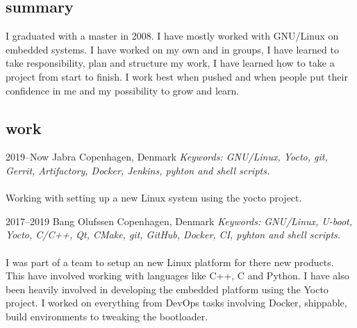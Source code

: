 \documentclass[nocolors]{template/friggeri-cv-a4}
\begin{document}
\subsection{summary}

I graduated with a master in 2008. I have mostly worked with GNU/Linux on embedded systems. I have worked on my own and in groups, I have learned to take responsibility, plan and structure my work, I have learned how to take a project from start to finish. I work best when pushed and when people put their confidence in me and my possibility to grow and learn.

\subsection{work}

\begin{entrylist}


\entry
{2019--Now}
{Jabra}
{Copenhagen, Denmark}
{\emph{Keywords: GNU/Linux, Yocto, git, Gerrit, Artifactory, Docker, Jenkins, pyhton and shell scripts.} \\
\\
Working with setting up a new Linux system using the yocto project.
\\
}


\entry
{2017--2019}
{Bang Olufssen}
{Copenhagen, Denmark}
{\emph{Keywords: GNU/Linux, U-boot, Yocto, C/C++, Qt, CMake, git, GitHub, Docker, CI, pyhton and shell scripts.} \\
\\
I was part of a team to setup an new Linux platform for there new products. This have involved working with languages like C++, C and Python. I have also been heavily involved in developing the embedded platform using the Yocto project. I worked on everything from DevOps tasks involving Docker, shippable, build environments to tweaking the bootloader.
\\
}



\end{entrylist}
\end{document}
